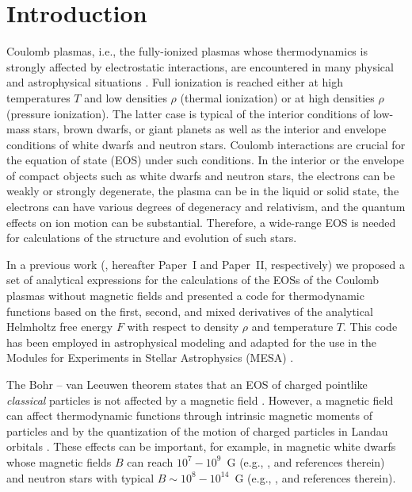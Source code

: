 \documentclass[traditabstract]{aa}
\begin{document}

\maketitle

\section{Introduction} 
\label{sect:intro}

Coulomb plasmas, i.e., the fully-ionized plasmas whose
thermodynamics is strongly affected by electrostatic
interactions, are encountered in many physical and astrophysical
situations \citep[e.g.,][]{Fortov}. Full ionization is
reached either at high temperatures $T$ and low densities
$\rho$ (thermal ionization) or at high densities $\rho$
(pressure ionization). The latter case is typical of the interior conditions
of low-mass stars, brown dwarfs, or giant planets
\citep{ChaBar} as well as
the interior and envelope conditions of
white dwarfs and neutron stars. Coulomb interactions
are crucial for the equation of state (EOS) under such conditions.
In the interior or the envelope of compact objects such as white dwarfs and neutron stars, the
electrons can be weakly or strongly degenerate, the plasma
can be in the liquid or solid state, the electrons can have
various degrees of degeneracy and relativism, and the
quantum effects on ion motion can be substantial. 
Therefore, a wide-range EOS is needed for calculations of
the structure and evolution of such stars.

In a previous work (\citealp{PC00,PC10}, hereafter 
Paper~I
and Paper~II, respectively) we proposed a set of analytical
expressions for the calculations of the EOSs of the Coulomb
plasmas without magnetic fields and presented a code for
thermodynamic functions based on the first, second, and
mixed derivatives of the analytical Helmholtz free energy
$F$ with respect to density $\rho$ and temperature $T$. This
code has been employed in astrophysical modeling and adapted
for the use in the Modules for Experiments in Stellar
Astrophysics (\textsc{MESA}) \citep{MESA}.

The Bohr -- van Leeuwen theorem states that an EOS of
charged pointlike \emph{classical} particles is not affected
by a magnetic field \citep{vanLeeuwen}. However, a magnetic field
can affect thermodynamic functions through intrinsic
magnetic moments of particles and by the quantization of the
motion of charged
particles in Landau orbitals \citep{Landau30,LaLi-QM}.
These effects can be important, for example, in magnetic
white dwarfs whose magnetic fields $B$ can reach 
$10^7-10^9$~G (e.g., \citealp{WickramaFerrario00}, and
references therein) and neutron stars with typical
$B\sim10^{8}-10^{14}$~G (e.g., \citealp{NSB1}, and
references therein).
\end{document}
